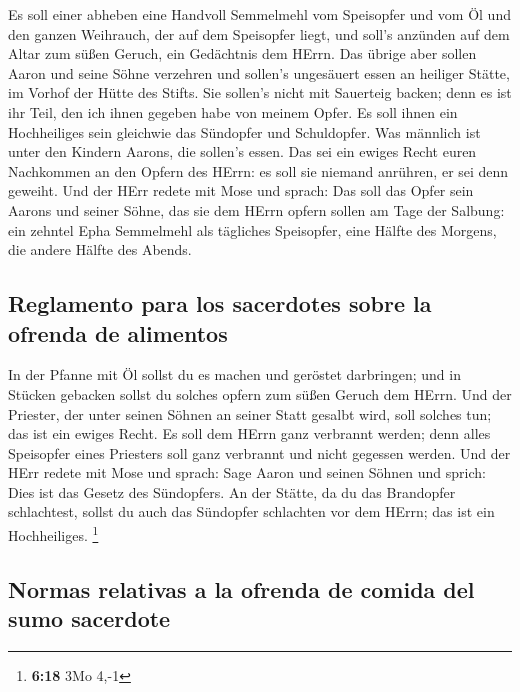  Es soll einer abheben eine Handvoll Semmelmehl vom
Speisopfer und vom Öl und den ganzen Weihrauch, der auf dem Speisopfer
liegt, und soll's anzünden auf dem Altar zum süßen Geruch, ein
Gedächtnis dem HErrn.  Das übrige aber sollen Aaron und
seine Söhne verzehren und sollen's ungesäuert essen an heiliger Stätte,
im Vorhof der Hütte des Stifts.  Sie sollen's nicht mit
Sauerteig backen; denn es ist ihr Teil, den ich ihnen gegeben habe von
meinem Opfer. Es soll ihnen ein Hochheiliges sein gleichwie das
Sündopfer und Schuldopfer.  Was männlich ist unter den
Kindern Aarons, die sollen's essen. Das sei ein ewiges Recht euren
Nachkommen an den Opfern des HErrn: es soll sie niemand anrühren, er sei
denn geweiht.  Und der HErr redete mit Mose und sprach:
 Das soll das Opfer sein Aarons und seiner Söhne, das sie
dem HErrn opfern sollen am Tage der Salbung: ein zehntel Epha Semmelmehl
als tägliches Speisopfer, eine Hälfte des Morgens, die andere Hälfte des
Abends.

\hypertarget{reglamento-para-los-sacerdotes-sobre-la-ofrenda-de-alimentos}{%
\subsection{Reglamento para los sacerdotes sobre la ofrenda de
alimentos}\label{reglamento-para-los-sacerdotes-sobre-la-ofrenda-de-alimentos}}

 In der Pfanne mit Öl sollst du es machen und geröstet
darbringen; und in Stücken gebacken sollst du solches opfern zum süßen
Geruch dem HErrn.  Und der Priester, der unter seinen
Söhnen an seiner Statt gesalbt wird, soll solches tun; das ist ein
ewiges Recht. Es soll dem HErrn ganz verbrannt werden; 
denn alles Speisopfer eines Priesters soll ganz verbrannt und nicht
gegessen werden.  Und der HErr redete mit Mose und
sprach:  Sage Aaron und seinen Söhnen und sprich: Dies
ist das Gesetz des Sündopfers. An der Stätte, da du das Brandopfer
schlachtest, sollst du auch das Sündopfer schlachten vor dem HErrn; das
ist ein Hochheiliges. \footnote{\textbf{6:18} 3Mo 4,-1}

\hypertarget{normas-relativas-a-la-ofrenda-de-comida-del-sumo-sacerdote}{%
\subsection{Normas relativas a la ofrenda de comida del sumo
sacerdote}\label{normas-relativas-a-la-ofrenda-de-comida-del-sumo-sacerdote}}

